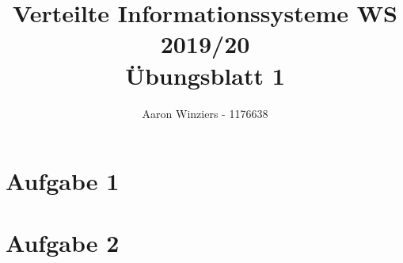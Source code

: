 \documentclass[11pt,a4paper,parskip=half ]{scrartcl}
\author{Aaron Winziers - 1176638}
\title{Verteilte Informationssysteme WS 2019/20\\\LARGE{Übungsblatt 1}}
\begin{document}
	\maketitle
	
	\section*{Aufgabe 1}
	\section*{Aufgabe 2}
	
\end{document}
